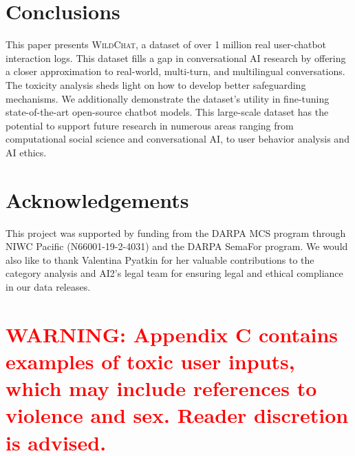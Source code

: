 \documentclass{article} %
\newcommand{\corpus}{\textsc{WildChat}\xspace}
\begin{document}


\section{Conclusions}
This paper presents \corpus, a dataset of over 1 million real user-chatbot interaction logs. This dataset fills a gap in conversational AI research by offering a closer approximation to real-world, multi-turn, and multilingual conversations. The toxicity analysis sheds light on how to develop better safeguarding mechanisms. We additionally demonstrate the dataset's utility in fine-tuning state-of-the-art open-source chatbot models. This large-scale dataset has the potential to support future research in numerous areas ranging from computational social science and conversational AI, to user behavior analysis and AI ethics.

\section{Acknowledgements}
This project was supported by funding from the DARPA MCS program through NIWC Pacific (N66001-19-2-4031) and the DARPA SemaFor program. We would also like to thank Valentina Pyatkin for her valuable contributions to the category analysis and AI2's legal team for ensuring legal and ethical compliance in our data releases.





\appendix

\clearpage

\section*{\textcolor{red}{ \normalsize{WARNING: Appendix C contains examples of toxic user inputs, which may include references to violence and sex. Reader discretion is advised.}}}
\end{document}
